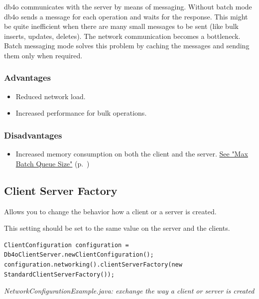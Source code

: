 db4o communicates with the server by means of messaging. Without batch mode db4o sends a message for each operation and waits for the response. This might be quite inefficient when there are many small messages to be sent (like bulk inserts, updates, deletes). The network communication becomes a bottleneck. Batch messaging mode solves this problem by caching the messages and sending them only when required.

\subsubsection*{Advantages}

\begin{itemize}
\item Reduced network load.
\item Increased performance for bulk operations.
\end{itemize}

\subsubsection*{Disadvantages}

\begin{itemize}
\item Increased memory consumption on both the client and the server. \hyperref[ref:configuration-networking-max-batch-queue-size]{See "Max Batch Queue Size"} (p.~\pageref{ref:configuration-networking-max-batch-queue-size})
\end{itemize}

\subsection{Client Server Factory}
\label{ref:configuration-networking-client-server-factory}

Allows you to change the behavior how a client or a server is created.

This setting should be set to the same value on the server and the clients.

\begin{lstlisting}
ClientConfiguration configuration = Db4oClientServer.newClientConfiguration();
configuration.networking().clientServerFactory(new StandardClientServerFactory());
\end{lstlisting}

{\small\itshape NetworkConfigurationExample.java: exchange the way a client or server is created\par}
\medskip

